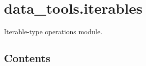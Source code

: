 \documentclass[letterpaper,10pt,english]{sphinxmanual}
\begin{document}
\label{\detokenize{iterables:module-data_tools.iterables}}

\section{data\_tools.iterables}
\label{\detokenize{iterables:data-tools-iterables}}\label{\detokenize{iterables::doc}}
Iterable-type operations module.


\subsection{Contents}
\label{\detokenize{iterables:contents}}
\end{document}
